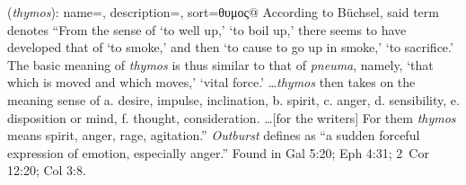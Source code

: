 \item[Outburst,]

(\textit{thymos}):
{
    name=,
    description={},
    sort=θυμος@
}
According to Büchsel, said term denotes ``From the sense of `to well up,' `to boil up,' there seems to have developed that of `to smoke,' and then `to cause to go up in smoke,' `to sacrifice.' The basic meaning of \emph{thymos} is thus similar to that of \emph{pneuma}, namely, `that which is moved and which moves,' `vital force.' \ldots \emph{thymos} then takes on the meaning sense of a. desire, impulse, inclination, b. spirit, c. anger, d. sensibility, e. disposition or mind, f. thought, consideration. \ldots [for the writers] For them \emph{thymos} means spirit, anger, rage, agitation.'' 
\emph{Outburst} defines as ``a sudden forceful expression of emotion, especially anger.''
Found in Gal 5:20; Eph 4:31; 2~Cor 12:20; Col 3:8.
